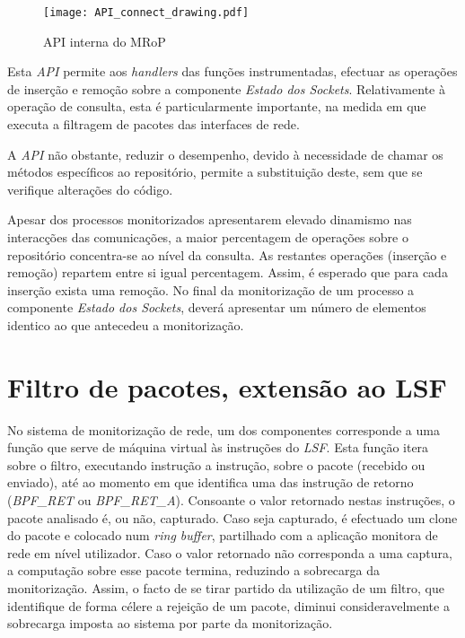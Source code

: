 \begin{figure}[ht]
\centering
\texttt{[image: API\_connect\_drawing.pdf]}
\caption{API interna do MRoP}
\label{fig:api_connect}
\end{figure}

Esta \textit{API} permite aos \textit{handlers} das funções instrumentadas, efectuar as operações de inserção e remoção sobre a componente \textit{Estado dos Sockets}.
Relativamente à operação de consulta, esta é particularmente importante, na medida em que executa a filtragem de pacotes das interfaces de rede.

A \textit{API} não obstante, reduzir o desempenho, devido à necessidade de chamar os métodos específicos ao repositório, permite a substituição deste, sem que se verifique alterações do código.

Apesar dos processos monitorizados apresentarem elevado dinamismo nas interacções das comunicações, a maior percentagem de operações sobre o repositório concentra-se ao nível da consulta.
As restantes operações (inserção e remoção) repartem entre si igual percentagem.
Assim, é esperado que para cada inserção exista uma remoção.
No final da monitorização de um processo a componente \textit{Estado dos Sockets}, deverá apresentar um número de elementos identico ao que antecedeu a monitorização.




\section{Filtro de pacotes, extensão ao LSF}

No sistema de monitorização de rede, um dos componentes corresponde a uma função que serve de máquina virtual às instruções do \textit{LSF}.
Esta função itera sobre o filtro, executando instrução a instrução, sobre o pacote (recebido ou enviado), até ao momento em que identifica uma das instrução de retorno (\textit{BPF\_RET} ou \textit{BPF\_RET\_A}).
Consoante o valor retornado nestas instruções, o pacote analisado é, ou não, capturado.
Caso seja capturado, é efectuado um clone do pacote e colocado num \textit{ring buffer}, partilhado com a aplicação monitora de rede em nível utilizador.
Caso o valor retornado não corresponda a uma captura, a computação sobre esse pacote termina, reduzindo a sobrecarga da monitorização.
Assim, o facto de se tirar partido da utilização de um filtro, que identifique de forma célere a rejeição de um pacote, diminui consideravelmente a sobrecarga imposta ao sistema por parte da monitorização.

